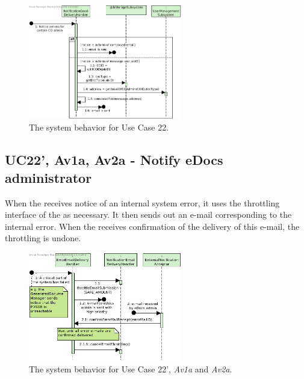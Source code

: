 \begin{figure}[!htp]
    \centering
    \includegraphics[width=0.6\textwidth]{figures/UC22 - Notify CO administrator.png}
    \caption{The system behavior for Use Case 22.
        }\label{fig:seq_uc22}
\end{figure}

\subsection{UC22', Av1a, Av2a - Notify eDocs administrator}
When the  receives notice of an internal system error, it uses the throttling interface of the  as necessary. It then sends out an e-mail corresponding to the internal error. When the  receives confirmation of the delivery of this e-mail, the throttling is undone.

\begin{figure}[!htp]
    \centering
    \includegraphics[width=0.6\textwidth]{figures/Av1a_2a UC22' - Notify eDocs Admin.png}
    \caption{The system behavior for Use Case 22', \emph{Av1a} and \emph{Av2a}.
        }\label{fig:seq_uc22'}
\end{figure}
